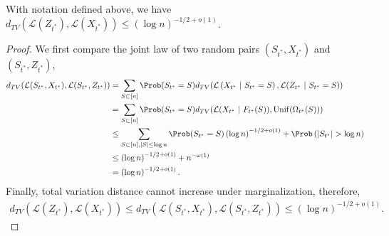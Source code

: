 \begin{lemma}\label{lemma::dTV of Z_t^* and X_t^*}
       With notation defined above, we have 
       $d_{TV}(\mathcal{L}(Z_{t^*}),\mathcal{L}(X_{t^*})) \leq (\log n)^{-1/2+o(1)}$.
\end{lemma}
\begin{proof}
    We first compare the joint law of two random pairs $(S_{t^*},X_{t^*})$ and $(S_{t^*}, Z_{t^*})$, 
    \begin{align*}
        d_{TV}(\mathcal{L}(S_{t^*},X_{t^*}),\mathcal{L}(S_{t^*},Z_{t^*})) &= \sum_{S\subset [n]} \Prob(S_{t^*}= S) d_{TV}(\mathcal{L}\left(X_{t^*}~|~S_{t^*}=S\right),\mathcal{L}(Z_{t^*}~|~S_{t^*}=S)) \\
        & = \sum_{S\subset [n]} \Prob(S_{t^*}= S) d_{TV}(\mathcal{L}(X_{t^*}~|~F_{t^*}(S)),\mathrm{Unif}(\Omega_{t^*}(S))) \\
        &\leq \sum_{S\subset [n], |S|\leq \log n} \Prob(S_{t^*}= S) \left(\log n\right)^{-1/2+o(1)} +\Prob\left(|S_{t^*}|>\log n\right) \\
        &\leq \left(\log n\right)^{-1/2+o(1)}+ n^{-\omega(1)}\\
        &=\left(\log n\right)^{-1/2+o(1)}.
    \end{align*}
    Finally, total variation distance cannot increase under marginalization, therefore,
    \begin{align*}
        d_{TV}(\mathcal{L}(Z_{t^*}),\mathcal{L}(X_{t^*})) \leq  d_{TV}(\mathcal{L}(S_{t^*},X_{t^*}),\mathcal{L}(S_{t^*},Z_{t^*})) \leq \left(\log n\right)^{-1/2+o(1)}.
    \end{align*}
\end{proof}

